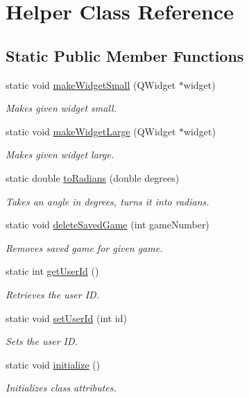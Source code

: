 \hypertarget{classHelper}{\section{\-Helper \-Class \-Reference}
\label{classHelper}
}
\subsection*{\-Static \-Public \-Member \-Functions}
\begin{DoxyCompactItemize}
\item 
static void \hyperlink{classHelper_a2eeb1ba71a75f4d0f59c6efdd429a1b7}{make\-Widget\-Small} (\-Q\-Widget $\ast$widget)
\begin{DoxyCompactList}\small\item\em \-Makes given widget small. \end{DoxyCompactList}\item 
static void \hyperlink{classHelper_a1c444bceb723964a341b1c8b2bd2f95c}{make\-Widget\-Large} (\-Q\-Widget $\ast$widget)
\begin{DoxyCompactList}\small\item\em \-Makes given widget large. \end{DoxyCompactList}\item 
static double \hyperlink{classHelper_ad085317d0b7ad0e5ac3d08b559a7015f}{to\-Radians} (double degrees)
\begin{DoxyCompactList}\small\item\em \-Takes an angle in degrees, turns it into radians. \end{DoxyCompactList}\item 
static void \hyperlink{classHelper_a63c2ce5e48ee451d4364726770047db1}{delete\-Saved\-Game} (int game\-Number)
\begin{DoxyCompactList}\small\item\em \-Removes saved game for given game. \end{DoxyCompactList}\item 
static int \hyperlink{classHelper_a26086740d6daa9a5d51a616498b921c8}{get\-User\-Id} ()
\begin{DoxyCompactList}\small\item\em \-Retrieves the user \-I\-D. \end{DoxyCompactList}\item 
static void \hyperlink{classHelper_acaf57a101dc37cd3c628b1c7d3e16b2d}{set\-User\-Id} (int id)
\begin{DoxyCompactList}\small\item\em \-Sets the user \-I\-D. \end{DoxyCompactList}\item 
static void \hyperlink{classHelper_aaaf9678b2140d1f394557af950de930f}{initialize} ()
\begin{DoxyCompactList}\small\item\em \-Initializes class attributes. \end{DoxyCompactList}\end{DoxyCompactItemize}
